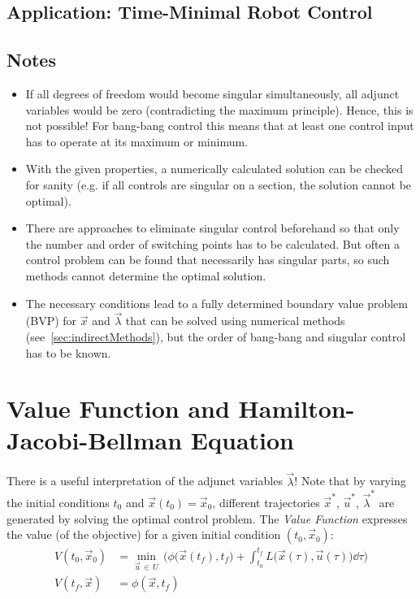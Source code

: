 		\subsection{Application: Time-Minimal Robot Control} %

		\subsection{Notes}
			\begin{itemize}
				\item If all degrees of freedom would become singular simultaneously, all adjunct variables would be zero (contradicting the maximum principle). Hence, this is not possible! For bang-bang control this means that at least one control input has to operate at its maximum or minimum.
				\item With the given properties, a numerically calculated solution can be checked for sanity (e.g. if all controls are singular on a section, the solution cannot be optimal).
				\item There are approaches to eliminate singular control beforehand so that only the number and order of switching points has to be calculated. But often a control problem can be found that necessarily has singular parts, so such methods cannot determine the optimal solution.
				\item The necessary conditions lead to a fully determined boundary value problem (BVP) for \(\vec{x}\) and \(\vec{\lambda}\) that can be solved using numerical methods (see~\autoref{sec:indirectMethods}), but the order of bang-bang and singular control has to be known.
			\end{itemize}

	\section{Value Function and Hamilton-Jacobi-Bellman Equation}
		There is a useful interpretation of the adjunct variables \(\vec{\lambda}\)! Note that by varying the initial conditions \(t_0\) and \( \vec{x}(t_0) = \vec{x}_0 \), different trajectories \(\vec{x}^\ast\), \(\vec{u}^\ast\), \(\vec{\lambda}^\ast\) are generated by solving the optimal control problem. The \emph{Value Function} expresses the value (of the objective) for a given initial condition \( (t_0, \vec{x}_0) \):
		\begin{align*}
			V(t_0, \vec{x}_0) &= \min_{\vec{u} \,\in\, U} \, \Bigg(\! \phi\big(\vec{x}(t_f), t_f\big) + \int_{t_0}^{t_f}\! L\big(\vec{x}(\tau), \vec{u}(\tau)\big) \dd{\tau} \!\Bigg) \\
			V(t_f, \vec{x})   &= \phi(\vec{x}, t_f)
		\end{align*}


